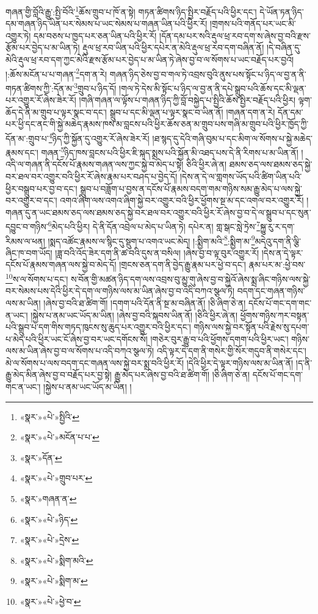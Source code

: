 གཞན་གྱི་བློའི་རྒྱུ་:སྤྱི་བོའི་\footnote{«སྣར་»«པེ་»སྤྱིའི་}ཆོས་གྲུབ་པ་ཁོ་ན་སྟེ། གཏན་ཚིགས་ཉིད་སྤྱིར་བརྗོད་པའི་ཕྱིར་དང་། དེ་ཡོན་ཏན་ཉིད་དམ་གཞན་ཉིད་ཡིན་པར་སེམས་པ་ཡང་སེམས་པ་གཞན་ཡིན་པའི་ཕྱིར་རོ། །གྲགས་པའི་གནོད་པར་ཡང་མི་འགྱུར་ཏེ། དམ་བཅས་པ་ཁྱད་པར་ཅན་ཡིན་པའི་ཕྱིར་རོ། །དོན་དམ་པར་སའི་རྡུལ་ཕྲ་རབ་དག་ས་ཞེས་བྱ་བའི་རྫས་རྩོམ་པར་བྱེད་པ་མ་ཡིན་ཏེ། རྡུལ་ཕྲ་རབ་ཡིན་པའི་ཕྱིར་དཔེར་ན་མེའི་རྡུལ་ཕྲ་རབ་དག་བཞིན་ནོ། །དེ་བཞིན་དུ་མེའི་རྡུལ་ཕྲ་རབ་དག་ཀྱང་མེའི་རྫས་རྩོམ་པར་བྱེད་པ་མ་ཡིན་ཏེ་ཞེས་བྱ་བ་ལ་སོགས་པ་ཡང་བརྗོད་པར་བྱའོ། །:ཆོས་མངོན་པ་པ་གཞན་\footnote{«སྣར་»«པེ་»མངོན་པ་པ་}དག་ན་རེ། གཞན་ཉིད་ཅེས་བྱ་བ་གལ་ཏེ་འབྲས་བུའི་ནུས་པས་སྟོང་པ་ཉིད་ལ་བྱ་ན་ནི་གཏན་ཚིགས་ཀྱི་:དོན་མ་\footnote{«སྣར་»དོན་}གྲུབ་པ་ཉིད་དོ། །གལ་ཏེ་དེས་མི་སྟོང་པ་ཉིད་ལ་བྱ་ན་ནི་དཔེ་སྒྲུབ་པའི་ཆོས་དང་མི་ལྡན་པར་འགྱུར་རོ་ཞེས་ཟེར་རོ། །གཞི་གཞན་ལ་ལྟོས་པ་གཞན་ཉིད་ཀྱི་བློ་བསྐྱེད་པ་སྤྱིའི་ཆོས་སྤྱིར་བརྗོད་པའི་ཕྱིར། ལྟག་ཆོད་དེ་ནི་མ་གྲུབ་པ་ལྟར་སྣང་བ་དང་། སྒྲུབ་པ་དང་མི་ལྡན་པ་ལྟར་སྣང་བ་ཡིན་ནོ། །གཞན་དག་ན་རེ། དོན་དམ་པར་ཕྱི་དང་ནང་གི་སྐྱེ་མཆེད་རྣམས་ཁས་མ་བླངས་པའི་ཕྱིར་ཆོས་ཅན་མ་གྲུབ་པས་གཞི་མ་གྲུབ་པའི་ཕྱིར་ཁྱོད་ཀྱི་དོན་མ་:གྲུབ་པ་\footnote{«སྣར་»«པེ་»གྲུབ་པར་}ཉིད་ཀྱི་སྐྱོན་དུ་འགྱུར་རོ་ཞེས་ཟེར་རོ། །ཐ་སྙད་དུ་དེའི་གཞི་བུམ་པ་དང་མིག་ལ་སོགས་པ་སྐྱེ་མཆེད་རྣམས་དང་། གཞན་\footnote{«སྣར་»གཞན་ན་}ཉིད་ཁས་བླངས་པའི་ཕྱིར་ཇི་སྐད་སྨྲས་པའི་སྐྱོན་མི་འཐད་པས་དེ་ནི་རིགས་པ་མ་ཡིན་ནོ། །འདི་ལ་གཞན་ནི་དངོས་པོ་རྣམས་གཞན་ལས་ཀྱང་སྐྱེ་བ་མེད་པ་སྟེ། ཅིའི་ཕྱིར་ཞེ་ན། ཐམས་ཅད་ལས་ཐམས་ཅད་སྐྱེ་བར་ཐལ་བར་འགྱུར་བའི་ཕྱིར་རོ་ཞེས་རྣམ་པར་བཤད་པ་བྱེད་དོ། །དེས་ན་དེ་ལ་གླགས་ཡོད་པའི་ཚིག་ཡིན་པའི་ཕྱིར་བསྒྲུབ་པར་བྱ་བ་དང་། སྒྲུབ་པ་བཟློག་པ་བྱས་ན་དངོས་པོ་རྣམས་བདག་གམ་གཉིས་སམ་རྒྱུ་མེད་པ་ལས་སྐྱེ་བར་འགྱུར་བ་དང་། འགའ་ཞིག་ལས་འགའ་ཞིག་སྐྱེ་བར་འགྱུར་བའི་ཕྱིར་ཕྱོགས་སྔ་མ་དང་འགལ་བར་འགྱུར་རོ། །གཞན་དུ་ན་ཡང་ཐམས་ཅད་ལས་ཐམས་ཅད་སྐྱེ་བར་ཐལ་བར་འགྱུར་བའི་ཕྱིར་རོ་ཞེས་བྱ་བ་དེ་ལ་སྒྲུབ་པ་དང་སུན་དབྱུང་བ་གཉིས་\footnote{«སྣར་»«པེ་»ཉིད་}མེད་པའི་ཕྱིར། དེ་ནི་དོན་འབྲེལ་པ་མེད་པ་ཡིན་ཏེ། དཔེར་ན། གླ་སྒང་སླེ་ཏྲེས་\footnote{«སྣར་»«པེ་»དྲེས་}སྐྱུ་རུ་ར་དག་རིམས་ལ་ཕན། །སྨད་འཚོང་རྣམས་ལ་སྙིང་དུ་སྡུག་པ་འགའ་ཡང་མེད། །:སྨྱིག་མའི་\footnote{«སྣར་»«པེ་»སྨིག་མའི་}:སྨྱིག་མ་\footnote{«སྣར་»«པེ་»སྨིག་མ་}མདེའུ་དག་ནི་ལྕི་ཞིང་ཁ་བག་ཡོད། །ཟླ་བའི་འོད་ཟེར་དག་ནི་ཚ་བའི་དུས་ན་བསིལ། །ཞེས་བྱ་བ་ལྟ་བུར་འགྱུར་རོ། །དེས་ན་དེ་ལྟར་དངོས་པོ་རྣམས་གཞན་ལས་སྐྱེ་བ་མེད་དོ། །གྲངས་ཅན་དག་ནི་བྱེད་རྒྱུ་རྣམ་པར་ཕྱེ་བ་དང་། རྣམ་པར་མ་:ཕྱེ་བས་\footnote{«སྣར་»«པེ་»ཕྱེ་བ་}ས་ལ་སོགས་པ་དང་། ས་བོན་གྱི་མཚན་ཉིད་དག་ལས་འབྲས་བུ་མྱུ་གུ་ཞེས་བྱ་བ་སྐྱེའོ་ཞེས་སྨྲ་ཞིང་གཉིས་ལས་སྐྱེ་བར་སེམས་པས་དེའི་ཕྱིར་དེ་དག་ལ་གཉིས་ལས་མ་ཡིན་ཞེས་བྱ་བ་འདི་བཀའ་སྩལ་ཏེ། བདག་དང་གཞན་གཉིས་ལས་མ་ཡིན། །ཞེས་བྱ་བའི་ཐ་ཚིག་གོ། །དགག་པའི་དོན་ནི་སྔ་མ་བཞིན་ནོ། །ཅི་ཞིག་ཅེ་ན། དངོས་པོ་གང་དག་གང་ན་ཡང་། །སྐྱེས་པ་ནམ་ཡང་ཡོད་མ་ཡིན། །ཞེས་བྱ་བའི་སྐབས་ཡིན་ནོ། །ཅིའི་ཕྱིར་ཞེ་ན། ཕྱོགས་གཉིས་ཀར་བསྟན་པའི་སྒྲུབ་པ་དག་གིས་གཏད་ཁུངས་སུ་ཆུད་པར་འགྱུར་བའི་ཕྱིར་དང་། གཉིས་ལས་སྐྱེ་བར་སྟོན་པའི་རྗེས་སུ་དཔག་པ་མེད་པའི་ཕྱིར་ཡང་ངོ་ཞེས་བྱ་བར་ཡང་དགོངས་སོ། །གཅེར་བུར་རྒྱུ་བ་པའི་ཕྱོགས་དགག་པའི་ཕྱིར་ཡང་། གཉིས་ལས་མ་ཡིན་ཞེས་བྱ་བ་ལ་སོགས་པ་འདི་བཀའ་སྩལ་ཏེ། འདི་ལྟར་དེ་དག་ནི་གསེར་གྱི་སོར་གདུབ་ནི་གསེར་དང་། མེ་ལ་སོགས་པ་ལས་བདག་དང་གཞན་ལས་སྐྱེ་བར་སྨྲ་བའི་ཕྱིར་རོ། །དེའི་ཕྱིར་དེ་ལྟར་གཉིས་ལས་མ་ཡིན་ནོ། །ད་ནི་རྒྱུ་མེད་མིན་ཞེས་བྱ་བ་བརྗོད་པར་བྱ་སྟེ། རྒྱུ་མེད་པར་ཞེས་བྱ་བའི་ཐ་ཚིག་གོ། །ཅི་ཞིག་ཅེ་ན། དངོས་པོ་གང་དག་གང་ན་ཡང་། །སྐྱེས་པ་ནམ་ཡང་ཡོད་མ་ཡིན། །
